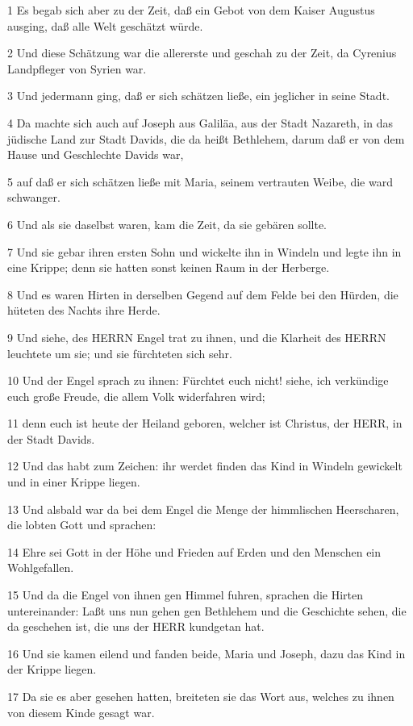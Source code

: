 \par 1 Es begab sich aber zu der Zeit, daß ein Gebot von dem Kaiser Augustus ausging, daß alle Welt geschätzt würde.
\par 2 Und diese Schätzung war die allererste und geschah zu der Zeit, da Cyrenius Landpfleger von Syrien war.
\par 3 Und jedermann ging, daß er sich schätzen ließe, ein jeglicher in seine Stadt.
\par 4 Da machte sich auch auf Joseph aus Galiläa, aus der Stadt Nazareth, in das jüdische Land zur Stadt Davids, die da heißt Bethlehem, darum daß er von dem Hause und Geschlechte Davids war,
\par 5 auf daß er sich schätzen ließe mit Maria, seinem vertrauten Weibe, die ward schwanger.
\par 6 Und als sie daselbst waren, kam die Zeit, da sie gebären sollte.
\par 7 Und sie gebar ihren ersten Sohn und wickelte ihn in Windeln und legte ihn in eine Krippe; denn sie hatten sonst keinen Raum in der Herberge.
\par 8 Und es waren Hirten in derselben Gegend auf dem Felde bei den Hürden, die hüteten des Nachts ihre Herde.
\par 9 Und siehe, des HERRN Engel trat zu ihnen, und die Klarheit des HERRN leuchtete um sie; und sie fürchteten sich sehr.
\par 10 Und der Engel sprach zu ihnen: Fürchtet euch nicht! siehe, ich verkündige euch große Freude, die allem Volk widerfahren wird;
\par 11 denn euch ist heute der Heiland geboren, welcher ist Christus, der HERR, in der Stadt Davids.
\par 12 Und das habt zum Zeichen: ihr werdet finden das Kind in Windeln gewickelt und in einer Krippe liegen.
\par 13 Und alsbald war da bei dem Engel die Menge der himmlischen Heerscharen, die lobten Gott und sprachen:
\par 14 Ehre sei Gott in der Höhe und Frieden auf Erden und den Menschen ein Wohlgefallen.
\par 15 Und da die Engel von ihnen gen Himmel fuhren, sprachen die Hirten untereinander: Laßt uns nun gehen gen Bethlehem und die Geschichte sehen, die da geschehen ist, die uns der HERR kundgetan hat.
\par 16 Und sie kamen eilend und fanden beide, Maria und Joseph, dazu das Kind in der Krippe liegen.
\par 17 Da sie es aber gesehen hatten, breiteten sie das Wort aus, welches zu ihnen von diesem Kinde gesagt war.

